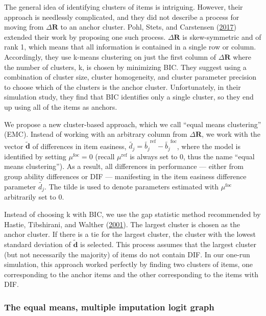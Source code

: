 \documentclass[
  11pt,
]{article}
\begin{document}
The general idea of identifying clusters of items is intriguing. However, their approach is needlessly complicated, and they did not describe a process for moving from \(\Delta \mathbf{R}\) to an anchor cluster. Pohl, Stets, and Carstensen (\protect\hyperlink{ref-pohl2017cluster}{2017}) extended their work by proposing one such process. \(\Delta \mathbf{R}\) is skew-symmetric and of rank 1, which means that all information is contained in a single row or column. Accordingly, they use k-means clustering on just the first column of \(\Delta \mathbf{R}\) where the number of clusters, k, is chosen by minimizing BIC. They suggest using a combination of cluster size, cluster homogeneity, and cluster parameter precision to choose which of the clusters is the anchor cluster. Unfortunately, in their simulation study, they find that BIC identifies only a single cluster, so they end up using all of the items as anchors.

We propose a new cluster-based approach, which we call \enquote{equal means clustering} (EMC). Instead of working with an arbitrary column from \(\Delta \mathbf{R}\), we work with the vector \(\tilde{\mathbf{d}}\) of differences in item easiness, \(\tilde{d_j} = \tilde{b_j}^\text{ref} - \tilde{b_j}^\text{foc}\), where the model is identified by setting \(\mu^\text{foc} = 0\) (recall \(\mu^\text{ref}\) is always set to \(0\), thus the name \enquote{equal means clustering}). As a result, all differences in performance --- either from group ability differences or DIF --- manifesting in the item easiness difference parameter \(\tilde{d_j}\). The tilde is used to denote parameters estimated with \(\mu^\text{foc}\) arbitrarily set to \(0\).

Instead of choosing k with BIC, we use the gap statistic method recommended by Hastie, Tibshirani, and Walther (\protect\hyperlink{ref-hastie2001estimating}{2001}). The largest cluster is chosen as the anchor cluster. If there is a tie for the largest cluster, the cluster with the lowest standard deviation of \(\tilde{\mathbf{d}}\) is selected. This process assumes that the largest cluster (but not necessarily the majority) of items do not contain DIF. In our one-run simulation, this approach worked perfectly by finding two clusters of items, one corresponding to the anchor items and the other corresponding to the items with DIF.

\hypertarget{the-equal-means-multiple-imputation-logit-graph}{%
\subsubsection{The equal means, multiple imputation logit graph}\label{the-equal-means-multiple-imputation-logit-graph}}
\end{document}
